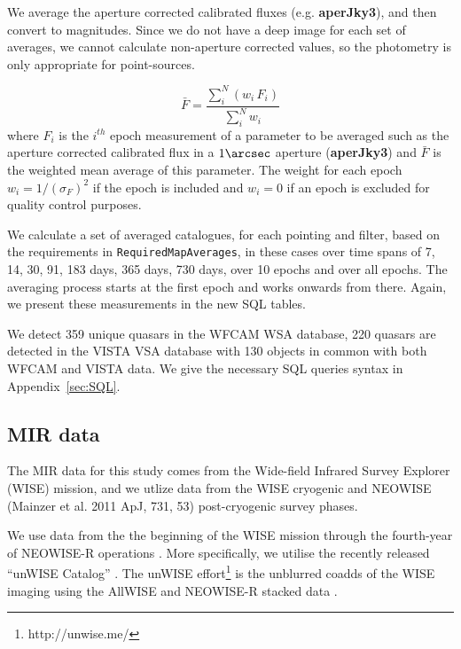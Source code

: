 \documentclass[usenatbib]{mnras}
\begin{document}
  We average the aperture corrected calibrated fluxes (e.g. {\bf
  aperJky3}), and then convert to magnitudes. Since we do not have a
  deep image for each set of averages, we cannot calculate non-aperture
  corrected values, so the photometry is only appropriate for
  point-sources.

  \begin{equation}
    \bar{F} = \frac{\sum_i^N (w_i\,F_i)}{\sum_i^N w_i}  
    \label{eq:avg}
  \end{equation}
  where $F_i$ is the $i^{th}$ epoch measurement of a parameter to be
  averaged such as the aperture corrected calibrated flux in a $1\arcsec$ aperture
  ({\bf aperJky3}) and $\bar{F}$ is the weighted mean average of this parameter.
  The weight for each epoch $w_i=1/(\sigma_{F})^2$ if the epoch is included and 
  $w_i=0$ if an epoch is excluded for quality control purposes. 
   
  We calculate a set of averaged catalogues, for each pointing and filter, based
  on the requirements in \verb+RequiredMapAverages+, in these cases over time
  spans of 7, 14, 30, 91, 183 days, 365 days, 730 days, over 10 epochs and
  over all epochs. The averaging process starts at the first epoch and works onwards 
  from there. Again, we present these measurements in the new SQL tables. 

  We detect 359 unique quasars in the WFCAM WSA database, 220 quasars are 
  detected in the VISTA VSA database with 130 objects in common with both
  WFCAM and VISTA data.  We give the necessary SQL queries syntax in Appendix~\ref{sec:SQL}.


\subsection{MIR data}
The MIR data for this study comes from the Wide-field Infrared Survey
Explorer (WISE) mission, and we utlize data from the WISE cryogenic
and NEOWISE (Mainzer et al. 2011 ApJ, 731, 53) post-cryogenic survey
phases.

We use data from the the beginning of the WISE mission \citep[2010 January; ][]{Wright2010} through the fourth-year of NEOWISE-R operations \citep[2017 December;]{Mainzer2011}.  More specifically, we utilise the recently released ``unWISE Catalog'' \citet{MeisnerSchlafly2019}. The unWISE effort\footnote{http://unwise.me/} is the unblurred coadds of the WISE imaging using the AllWISE and NEOWISE-R stacked data \citep{Lang2014, Meisner2018a, Meisner2018b}. %
\end{document}
